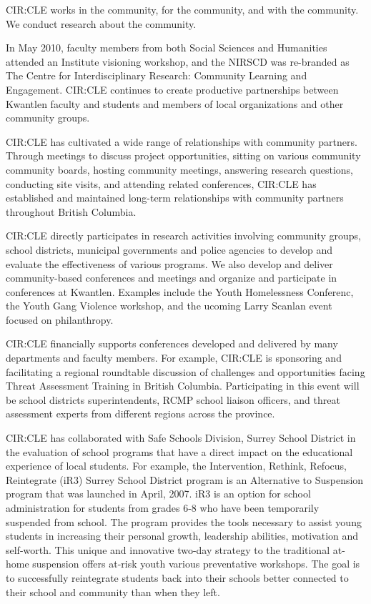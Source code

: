 \documentclass[12pt,DIV11,letterpaper,oneside,abstractoff,headsepline]{scrreprt}
\begin{document}
CIR:CLE works in the community, for the community, and with the community. We conduct research about the community. 

In May 2010, faculty members from both Social Sciences and Humanities attended an Institute visioning workshop, and the NIRSCD was re-branded as The Centre for Interdisciplinary Research: Community Learning and Engagement. CIR:CLE continues to create productive partnerships between Kwantlen faculty and students and members of local organizations and other community groups.

CIR:CLE has cultivated a wide range of relationships with community partners. Through meetings to discuss project opportunities, sitting on various community community boards, hosting community meetings, answering research questions, conducting site visits, and attending related conferences, CIR:CLE has established and maintained long-term relationships with community partners throughout British Columbia.

CIR:CLE directly participates in research activities involving community groups, school districts, municipal governments and police agencies to develop and evaluate the effectiveness of various programs. We also develop and deliver community-based conferences and meetings and organize and participate in conferences at Kwantlen. Examples include the Youth Homelessness Conferenc, the Youth Gang Violence workshop, and the ucoming Larry Scanlan event focused on philanthropy. 

CIR:CLE financially supports conferences developed and delivered by many departments and faculty members. For example, CIR:CLE is sponsoring and facilitating a regional roundtable discussion of challenges and opportunities facing Threat Assessment Training in British Columbia. Participating in this event will be school districts superintendents, RCMP school liaison officers, and threat assessment experts from different regions across the province.

CIR:CLE has collaborated with Safe Schools Division, Surrey School District in the evaluation of school programs that have a direct impact on the educational experience of local students. For example, the Intervention, Rethink, Refocus, Reintegrate (iR3) Surrey School District program is an Alternative to Suspension program that was launched in April, 2007. iR3 is an option for school administration for students from grades 6-8 who have been temporarily suspended from school. The program provides the tools necessary to assist young students in increasing their personal growth, leadership abilities, motivation and self-worth. This unique and innovative two-day strategy to the traditional at-home suspension offers at-risk youth various preventative workshops. The goal is to successfully reintegrate students back into their schools better connected to their school and community than when they left.
\end{document}

